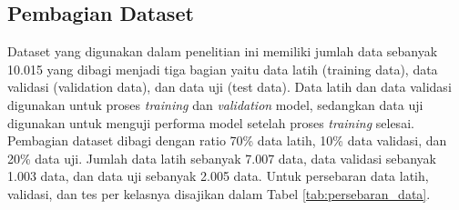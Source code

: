 \subsection{Pembagian Dataset} \label{IV.Pembagian_Dataset}
Dataset yang digunakan dalam penelitian ini memiliki jumlah data sebanyak 
10.015 yang dibagi menjadi tiga bagian yaitu data latih (training data), 
data validasi (validation data), dan data uji (test data). Data latih dan 
data validasi digunakan untuk proses \textit{training} dan 
\textit{validation} model, sedangkan data uji digunakan untuk menguji 
performa model setelah proses \textit{training} selesai. Pembagian dataset 
dibagi dengan ratio 70\% data latih, 10\% data validasi, dan 20\% data uji. 
Jumlah data latih sebanyak 7.007 data, data validasi sebanyak 1.003 data, 
dan data uji sebanyak 2.005 data. Untuk persebaran data latih, validasi, 
dan tes per kelasnya disajikan dalam Tabel \ref{tab:persebaran_data}. \par


